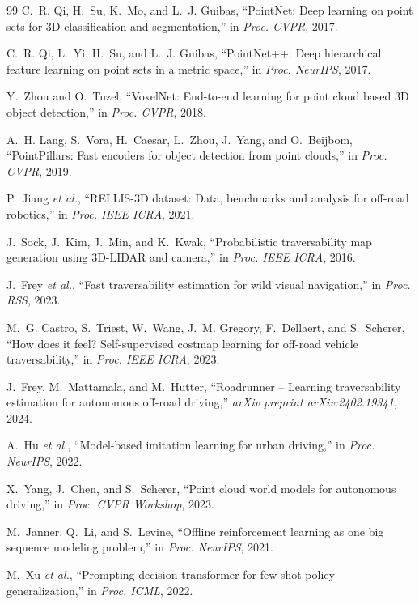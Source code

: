 \documentclass[journal]{IEEEtran}
\begin{document}
\begin{thebibliography}{99}
C.~R. Qi, H.~Su, K.~Mo, and L.~J. Guibas, ``PointNet: Deep learning on point sets for 3D classification and segmentation,'' in \textit{Proc. CVPR}, 2017.

C.~R. Qi, L.~Yi, H.~Su, and L.~J. Guibas, ``PointNet++: Deep hierarchical feature learning on point sets in a metric space,'' in \textit{Proc. NeurIPS}, 2017.

Y.~Zhou and O.~Tuzel, ``VoxelNet: End-to-end learning for point cloud based 3D object detection,'' in \textit{Proc. CVPR}, 2018.

A.~H. Lang, S.~Vora, H.~Caesar, L.~Zhou, J.~Yang, and O.~Beijbom, ``PointPillars: Fast encoders for object detection from point clouds,'' in \textit{Proc. CVPR}, 2019.

P.~Jiang \textit{et al.}, ``RELLIS-3D dataset: Data, benchmarks and analysis for off-road robotics,'' in \textit{Proc. IEEE ICRA}, 2021.

J.~Sock, J.~Kim, J.~Min, and K.~Kwak, ``Probabilistic traversability map generation using 3D-LIDAR and camera,'' in \textit{Proc. IEEE ICRA}, 2016.

J.~Frey \textit{et al.}, ``Fast traversability estimation for wild visual navigation,'' in \textit{Proc. RSS}, 2023.

M.~G. Castro, S.~Triest, W.~Wang, J.~M. Gregory, F.~Dellaert, and S.~Scherer, ``How does it feel? Self-supervised costmap learning for off-road vehicle traversability,'' in \textit{Proc. IEEE ICRA}, 2023.

J.~Frey, M.~Mattamala, and M.~Hutter, ``Roadrunner -- Learning traversability estimation for autonomous off-road driving,'' \textit{arXiv preprint arXiv:2402.19341}, 2024.

A.~Hu \textit{et al.}, ``Model-based imitation learning for urban driving,'' in \textit{Proc. NeurIPS}, 2022.

X.~Yang, J.~Chen, and S.~Scherer, ``Point cloud world models for autonomous driving,'' in \textit{Proc. CVPR Workshop}, 2023.

M.~Janner, Q.~Li, and S.~Levine, ``Offline reinforcement learning as one big sequence modeling problem,'' in \textit{Proc. NeurIPS}, 2021.

M.~Xu \textit{et al.}, ``Prompting decision transformer for few-shot policy generalization,'' in \textit{Proc. ICML}, 2022.


\end{thebibliography}
\end{document}
